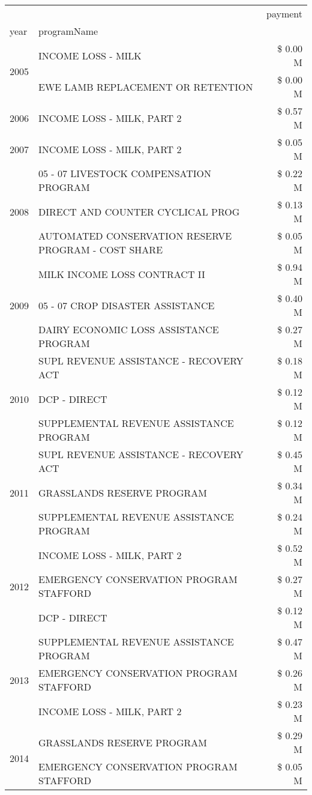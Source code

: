 \begin{tabular}{llr}
\toprule
 &  & payment \\
year & programName &  \\
\midrule
\multirow[t]{2}{*}{2005} & INCOME LOSS - MILK & \$ 0.00 M \\
 & EWE LAMB REPLACEMENT OR RETENTION & \$ 0.00 M \\
\cline{1-3}
2006 & INCOME LOSS - MILK, PART 2 & \$ 0.57 M \\
\cline{1-3}
2007 & INCOME LOSS - MILK, PART 2 & \$ 0.05 M \\
\cline{1-3}
\multirow[t]{3}{*}{2008} & 05 - 07 LIVESTOCK COMPENSATION PROGRAM & \$ 0.22 M \\
 & DIRECT AND COUNTER CYCLICAL PROG & \$ 0.13 M \\
 & AUTOMATED CONSERVATION RESERVE PROGRAM - COST SHARE & \$ 0.05 M \\
\cline{1-3}
\multirow[t]{3}{*}{2009} & MILK INCOME LOSS CONTRACT II & \$ 0.94 M \\
 & 05 - 07 CROP DISASTER ASSISTANCE & \$ 0.40 M \\
 & DAIRY ECONOMIC LOSS ASSISTANCE PROGRAM & \$ 0.27 M \\
\cline{1-3}
\multirow[t]{3}{*}{2010} & SUPL REVENUE ASSISTANCE - RECOVERY ACT & \$ 0.18 M \\
 & DCP - DIRECT & \$ 0.12 M \\
 & SUPPLEMENTAL REVENUE ASSISTANCE PROGRAM & \$ 0.12 M \\
\cline{1-3}
\multirow[t]{3}{*}{2011} & SUPL REVENUE ASSISTANCE - RECOVERY ACT & \$ 0.45 M \\
 & GRASSLANDS RESERVE PROGRAM & \$ 0.34 M \\
 & SUPPLEMENTAL REVENUE ASSISTANCE PROGRAM & \$ 0.24 M \\
\cline{1-3}
\multirow[t]{3}{*}{2012} & INCOME LOSS - MILK, PART 2 & \$ 0.52 M \\
 & EMERGENCY CONSERVATION PROGRAM STAFFORD & \$ 0.27 M \\
 & DCP - DIRECT & \$ 0.12 M \\
\cline{1-3}
\multirow[t]{3}{*}{2013} & SUPPLEMENTAL REVENUE ASSISTANCE PROGRAM & \$ 0.47 M \\
 & EMERGENCY CONSERVATION PROGRAM STAFFORD & \$ 0.26 M \\
 & INCOME LOSS - MILK, PART 2 & \$ 0.23 M \\
\cline{1-3}
\multirow[t]{3}{*}{2014} & GRASSLANDS RESERVE PROGRAM & \$ 0.29 M \\
 & EMERGENCY CONSERVATION PROGRAM STAFFORD & \$ 0.05 M \\

\end{tabular}
